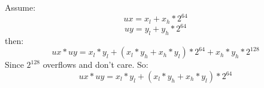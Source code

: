\documentclass{article}
\begin{document}
Assume:
\[
ux = x_l + x_h * 2^{64}
\]
\[
uy = y_l + y_h * 2^{64}
\]
then:
\[
ux * uy = x_l * y_l + (x_l * y_h + x_h * y_l) * 2^{64} + x_h * y_h * 2^{128}
\]
Since $2^{128}$ overflows and don't care. So:
\[
ux * uy = x_l * y_l + (x_l * y_h + x_h * y_l) * 2^{64}
\]
\end{document}
